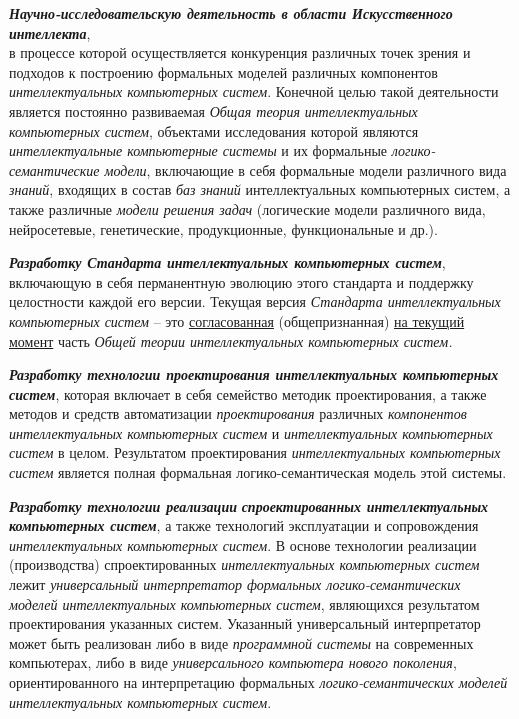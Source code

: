 \begin{textitemize}
	\item
	\textbf{\textit{Научно-исследовательскую деятельность в области Искусственного интеллекта}},\\
	в процессе которой осуществляется конкуренция различных точек зрения и подходов к построению формальных моделей различных компонентов \textit{интеллектуальных компьютерных систем}. Конечной целью такой деятельности является постоянно развиваемая \textit{Общая теория} \textit{интеллектуальных} \textit{компьютерных систем}, объектами исследования которой являются \textit{интеллектуальные компьютерные системы} и их формальные \textit{логико-семантические модели}, включающие в себя формальные модели различного вида \textit{знаний}, входящих в состав \textit{баз знаний} интеллектуальных компьютерных систем, а также различные \textit{модели решения задач} (логические модели различного вида, нейросетевые, генетические, продукционные, функциональные и др.).
	\item
	\textbf{\textit{Разработку Стандарта интеллектуальных компьютерных систем}}, включающую в себя перманентную эволюцию этого стандарта и поддержку целостности каждой его версии. Текущая версия \textit{Стандарта интеллектуальных компьютерных систем} -- это \underline{согласованная} (общепризнанная) \underline{на текущий момент} часть \textit{Общей теории интеллектуальных компьютерных систем.}
	\item
	\textbf{\textit{Разработку технологии проектирования интеллектуальных компьютерных систем}}, которая включает в себя семейство методик проектирования, а также методов и средств автоматизации \textit{проектирования} различных \textit{компонентов} \textit{интеллектуальных компьютерных систем} и \textit{интеллектуальных компьютерных систем} в целом. Результатом проектирования \textit{интеллектуальных компьютерных систем} является полная формальная логико-семантическая модель этой системы.
	\item
	\textbf{\textit{Разработку технологии реализации}} \textbf{\textit{спроектированных интеллектуальных компьютерных систем}}, а также технологий эксплуатации и сопровождения \textit{интеллектуальных компьютерных систем}. В основе технологии реализации (производства) спроектированных \textit{интеллектуальных компьютерных систем} лежит \textit{универсальный интерпретатор формальных логико-семантических моделей интеллектуальных компьютерных систем}, являющихся результатом проектирования указанных систем. Указанный универсальный интерпретатор может быть реализован либо в виде \textit{программной системы} на современных компьютерах, либо в виде \textit{универсального компьютера нового поколения}, ориентированного на интерпретацию формальных \textit{логико-семантических моделей интеллектуальных компьютерных систем}.

\end{textitemize}
